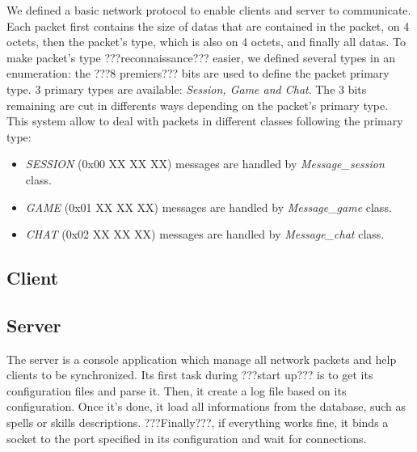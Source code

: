 \documentclass{scrreprt}
\begin{document}
		We defined a basic network protocol to enable clients and server to communicate. Each packet first contains the size of datas that are contained in the packet, on 4 octets, then the packet's type, which is also on 4 octets, and finally all datas. To make packet's type ???reconnaissance??? easier, we defined several types in an enumeration: the ???8 premiers??? bits are used to define the packet primary type. 3 primary types are available: \emph{Session, Game and Chat}. The 3 bits remaining are cut in differents ways depending on the packet's primary type. This system allow to deal with packets in different classes following the primary type:
		\begin{itemize}
		\item{\emph{SESSION} (0x00 XX XX XX) messages are handled by \emph{Message\_session} class.}
		\item{\emph{GAME} (0x01 XX XX XX) messages are handled by \emph{Message\_game} class.}
		\item{\emph{CHAT} (0x02 XX XX XX) messages are handled by \emph{Message\_chat} class.}
		\end{itemize}


		\subsection{Client}
		\subsection{Server}
		The server is a console application which manage all network packets and help clients to be synchronized. Its first task during ???start up??? is to  get its configuration files and parse it. Then, it create a log file based on its configuration. Once it's done, it load all informations from the database, such as spells or skills descriptions. ???Finally???, if everything works fine, it binds a socket to the port specified in its configuration and wait for connections.
\end{document}
